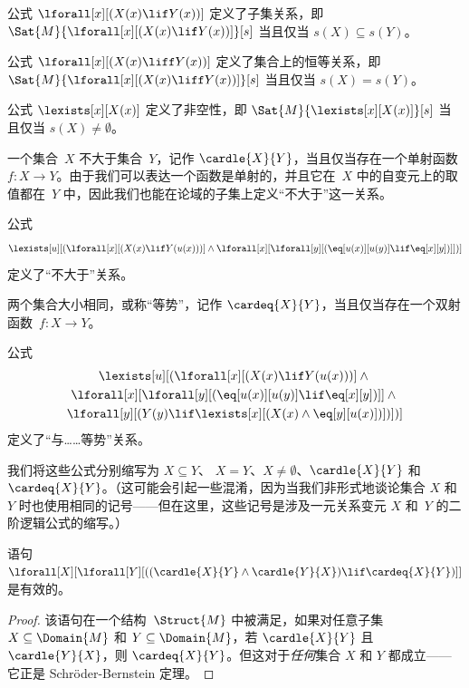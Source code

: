 \documentclass[../../../include/open-logic-section]{subfiles}
\begin{document}


\begin{prop}
公式 $\lforall[x][(X(x) \lif Y(x))]$ 定义了子集关系，即 $\Sat{M}{\lforall[x][(X(x) \lif Y(x))]}[s]$ 当且仅当 $s(X)
\subseteq s(Y)$。
\end{prop}

\begin{prop}
公式 $\lforall[x][(X(x) \liff Y(x))]$ 定义了集合上的恒等关系，即 $\Sat{M}{\lforall[x][(X(x) \liff Y(x))]}[s]$
当且仅当 $s(X) = s(Y)$。
\end{prop}

\begin{prop}
公式 $\lexists[x][X(x)]$ 定义了非空性，即 $\Sat{M}{\lexists[x][X(x)]}[s]$ 当且仅当 $s(X) \neq
\emptyset$。
\end{prop}

一个集合~$X$ 不大于集合~$Y$，记作 $\cardle{X}{Y}$，当且仅当存在一个单射函数 $f\colon X \to Y$。由于我们可以表达一个函数是单射的，并且它在~$X$ 中的自变元上的取值都在~$Y$ 中，因此我们也能在论域的子集上定义“不大于”这一关系。

\begin{prop}
公式
\[
\lexists[u][(\lforall[x][(X(x) \lif Y(u(x)))] \land \lforall[x][\lforall[y][(\eq[u(x)][u(y)] \lif
      \eq[x][y])]])]
\]
定义了“不大于”关系。
\end{prop}

两个集合大小相同，或称“等势”，记作 $\cardeq{X}{Y}$，当且仅当存在一个双射函数~$f\colon X \to Y$。

\begin{prop}
公式
\begin{multline*}
  \lexists[u][(\lforall[x][(X(x) \lif Y(u(x)))] \land {}\\
    \lforall[x][\lforall[y][(\eq[u(x)][u(y)] \lif \eq[x][y])]]
  \land {} \\\lforall[y][(Y(y) \lif \lexists[x][(X(x)
      \land \eq[y][u(x)])])])]
\end{multline*}
定义了“与……等势”关系。
\end{prop}

我们将这些公式分别缩写为 $X \subseteq Y$、
$X = Y$、$X \neq \emptyset$、$\cardle{X}{Y}$ 和
$\cardeq{X}{Y}$。（这可能会引起一些混淆，因为当我们非形式地谈论集合 $X$ 和 $Y$ 时也使用相同的记号——但在这里，这些记号是涉及一元关系变元 $X$ 和~$Y$ 的二阶逻辑公式的缩写。）

\begin{prop}
语句 $\lforall[X][\lforall[Y][((\cardle{X}{Y} \land
    \cardle{Y}{X}) \lif \cardeq{X}{Y})]]$ 是有效的。
\end{prop}

\begin{proof}
该语句在一个结构~$\Struct{M}$ 中被满足，如果对任意子集 $X \subseteq \Domain{M}$ 和 $Y \subseteq \Domain{M}$，若 $\cardle{X}{Y}$ 且 $\cardle{Y}{X}$，则 $\cardeq{X}{Y}$。但这对于\emph{任何}集合 $X$ 和 $Y$ 都成立——它正是 Schr\"oder-Bernstein 定理。
\end{proof}
\end{document}
